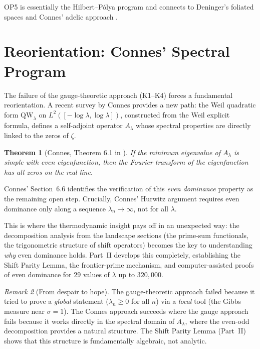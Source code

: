\documentclass[12pt,a4paper]{article}
\newtheorem{theorem}{Theorem}[section]
\theoremstyle{definition}
\theoremstyle{remark}
\newtheorem{remark}[theorem]{Remark}
\begin{document}
OP5 is essentially the Hilbert--P\'olya program and connects to Deninger's foliated spaces \cite{Deninger2002} and Connes' adelic approach \cite{Connes1999}.


\section{Reorientation: Connes' Spectral Program}
\label{sec:reorientation}

The failure of the gauge-theoretic approach (K1--K4) forces a fundamental reorientation. A recent survey by Connes \cite{Connes2025} provides a new path: the Weil quadratic form $\mathrm{QW}_\lambda$ on $L^2([-\log\lambda, \log\lambda])$, constructed from the Weil explicit formula, defines a self-adjoint operator $A_\lambda$ whose spectral properties are directly linked to the zeros of $\zeta$.

\begin{theorem}[Connes, Theorem 6.1 in \cite{Connes2025}]
If the minimum eigenvalue of $A_\lambda$ is simple with even eigenfunction, then the Fourier transform of the eigenfunction has all zeros on the real line.
\end{theorem}

Connes' Section~6.6 identifies the verification of this \emph{even dominance} property as the remaining open step. Crucially, Connes' Hurwitz argument requires even dominance only along a sequence $\lambda_n \to \infty$, not for all $\lambda$.

This is where the thermodynamic insight pays off in an unexpected way: the decomposition analysis from the landscape sections (the prime-sum functionals, the trigonometric structure of shift operators) becomes the key to understanding \emph{why} even dominance holds. Part~II develops this completely, establishing the Shift Parity Lemma, the frontier-prime mechanism, and computer-assisted proofs of even dominance for $29$ values of $\lambda$ up to $320{,}000$.

\begin{remark}[From despair to hope]
The gauge-theoretic approach failed because it tried to prove a \emph{global} statement ($\lambda_n \geq 0$ for all $n$) via a \emph{local} tool (the Gibbs measure near $\sigma = 1$). The Connes approach succeeds where the gauge approach fails because it works directly in the spectral domain of $A_\lambda$, where the even-odd decomposition provides a natural structure. The Shift Parity Lemma (Part~II) shows that this structure is fundamentally algebraic, not analytic.
\end{remark}
\end{document}
